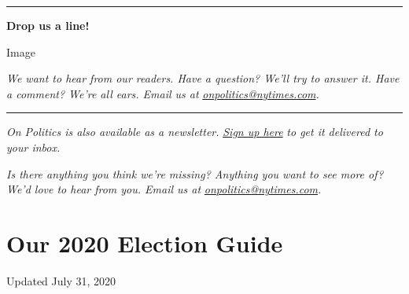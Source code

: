 \begin{center}\rule{0.5\linewidth}{\linethickness}\end{center}

\textbf{Drop us a line!}

Image

\emph{We want to hear from our readers. Have a question? We'll try to
answer it. Have a comment? We're all ears. Email us at}
\href{mailto:onpolitics@nytimes.com}{\emph{onpolitics@nytimes.com}}\emph{.}

\begin{center}\rule{0.5\linewidth}{\linethickness}\end{center}

\emph{On Politics is also available as a newsletter.}
\href{https://www.nytimes.com/newsletters/politics}{\emph{Sign up here}}
\emph{to get it delivered to your inbox.}

\emph{Is there anything you think we're missing? Anything you want to
see more of? We'd love to hear from you. Email us at}
\href{mailto:onpolitics@nytimes.com}{\emph{onpolitics@nytimes.com}}\emph{.}

\hypertarget{our-2020-election-guide}{%
\section{Our 2020 Election Guide}\label{our-2020-election-guide}}

Updated July 31, 2020

